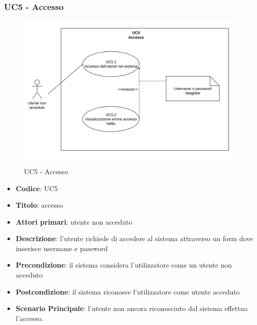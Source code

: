 

\subsubsection{UC5 - Accesso}
		\begin{figure}[H]
			\centering
				\includegraphics[width=\columnwidth]{img/UC5.png}\\
			\caption{UC5 - Accesso}
		\end{figure}
	\begin{itemize}
		\item \textbf{Codice}: UC5
		\item \textbf{Titolo}: accesso
		\item \textbf{Attori primari}: utente non acceduto
		\item \textbf{Descrizione}: l'utente richiede di accedere al sistema attraverso un form dove inserisce username e password
		\item \textbf{Precondizione}: il sistema considera l’utilizzatore come un utente non acceduto
		\item \textbf{Postcondizione}: il sistema riconosce l'utilizzatore come utente acceduto
		\item \textbf{Scenario Principale}: l'utente non ancora riconosciuto dal sistema effettua l'accesso.
	\end{itemize}
	
